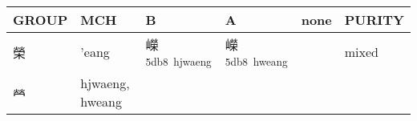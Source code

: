 \documentclass[14pt,a4paper]{scrartcl}
\begin{document}
\begin{longtable}[c]{@{}llllll@{}}
\toprule
\begin{minipage}[b]{0.14\columnwidth}\raggedright\strut
GROUP
\strut\end{minipage} &
\begin{minipage}[b]{0.14\columnwidth}\raggedright\strut
MCH
\strut\end{minipage} &
\begin{minipage}[b]{0.14\columnwidth}\raggedright\strut
B
\strut\end{minipage} &
\begin{minipage}[b]{0.14\columnwidth}\raggedright\strut
A
\strut\end{minipage} &
\begin{minipage}[b]{0.14\columnwidth}\raggedright\strut
none
\strut\end{minipage} &
\begin{minipage}[b]{0.14\columnwidth}\raggedright\strut
PURITY
\strut\end{minipage}\tabularnewline
\midrule
\endhead
\begin{minipage}[t]{0.14\columnwidth}\raggedright\strut
榮
\strut\end{minipage} &
\begin{minipage}[t]{0.14\columnwidth}\raggedright\strut
'eang
\strut\end{minipage} &
\begin{minipage}[t]{0.14\columnwidth}\raggedright\strut
嶸\textsuperscript{5db8~hjwaeng}
\strut\end{minipage} &
\begin{minipage}[t]{0.14\columnwidth}\raggedright\strut
嶸\textsuperscript{5db8~hweang}
\strut\end{minipage} &
\begin{minipage}[t]{0.14\columnwidth}\raggedright\strut
\strut\end{minipage} &
\begin{minipage}[t]{0.14\columnwidth}\raggedright\strut
mixed
\strut\end{minipage}\tabularnewline
\begin{minipage}[t]{0.14\columnwidth}\raggedright\strut
𤇾
\strut\end{minipage} &
\begin{minipage}[t]{0.14\columnwidth}\raggedright\strut
hjwaeng, hweang
\strut\end{minipage} &
\begin{minipage}[t]{0.14\columnwidth}\raggedright\strut
\strut\end{minipage} &

\end{longtable}
\end{document}
